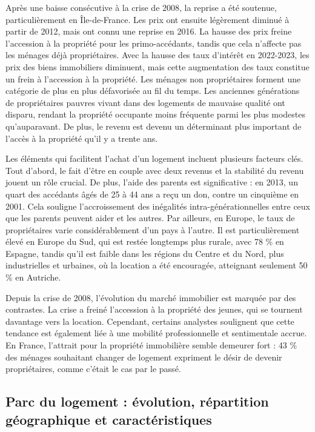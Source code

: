 \documentclass[a4paper, 12pt]{report}
\begin{document}
Après une baisse consécutive à la crise de 2008, la reprise a été soutenue, particulièrement en Île-de-France. Les prix ont ensuite légèrement diminué à partir de 2012, mais ont connu une reprise en 2016. La hausse des prix freine l’accession à la propriété pour les primo-accédants, tandis que cela n'affecte pas les ménages déjà propriétaires. Avec la hausse des taux d’intérêt en 2022-2023, les prix des biens immobiliers diminuent, mais cette augmentation des taux constitue un frein à l’accession à la propriété. Les ménages non propriétaires forment une catégorie de plus en plus défavorisée au fil du temps. Les anciennes générations de propriétaires pauvres vivant dans des logements de mauvaise qualité ont disparu, rendant la propriété occupante moins fréquente parmi les plus modestes qu'auparavant. De plus, le revenu est devenu un déterminant plus important de l’accès à la propriété qu’il y a trente ans.

Les éléments qui facilitent l’achat d’un logement incluent plusieurs facteurs clés. Tout d’abord, le fait d’être en couple avec deux revenus et la stabilité du revenu jouent un rôle crucial. De plus, l’aide des parents est significative : en 2013, un quart des accédants âgés de 25 à 44 ans a reçu un don, contre un cinquième en 2001. Cela souligne l’accroissement des inégalités intra-générationnelles entre ceux que les parents peuvent aider et les autres. Par ailleurs, en Europe, le taux de propriétaires varie considérablement d’un pays à l’autre. Il est particulièrement élevé en Europe du Sud, qui est restée longtemps plus rurale, avec 78 \% en Espagne, tandis qu'il est faible dans les régions du Centre et du Nord, plus industrielles et urbaines, où la location a été encouragée, atteignant seulement 50 \% en Autriche.

Depuis la crise de 2008, l’évolution du marché immobilier est marquée par des contrastes. La crise a freiné l’accession à la propriété des jeunes, qui se tournent davantage vers la location. Cependant, certains analystes soulignent que cette tendance est également liée à une mobilité professionnelle et sentimentale accrue. En France, l’attrait pour la propriété immobilière semble demeurer fort : 43 \% des ménages souhaitant changer de logement expriment le désir de devenir propriétaires, comme c’était le cas par le passé.

\subsection{Parc du logement : évolution, répartition géographique et caractéristiques}
\end{document}
